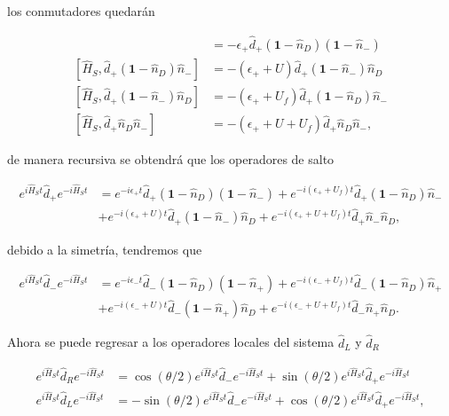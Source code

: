 \begin{appendixs}
los conmutadores quedarán

\begin{align*}
    [\hat{H}_{S},\hat{d}_{+}(\textbf{1}-\hat{n}_{D})(\textbf{1} - \hat{n}_{-})] & = - \epsilon_{+}\hat{d}_{+}(\textbf{1}-\hat{n}_{D})(\textbf{1} - \hat{n}_{-}) \\
    [\hat{H}_{S},\hat{d}_{+}(\textbf{1}-\hat{n}_{D})\hat{n}_{-}] & = - (\epsilon_{+} + U)\hat{d}_{+}(\textbf{1} - \hat{n}_{-})\hat{n}_{D} \\
    [\hat{H}_{S},\hat{d}_{+}(\textbf{1}-\hat{n}_{-})\hat{n}_{D}] & = - (\epsilon_{+} + U_{f})\hat{d}_{+}(\textbf{1} - \hat{n}_{D})\hat{n}_{-} \\
    [\hat{H}_{S},\hat{d}_{+}\hat{n}_{D}\hat{n}_{-}] & = - (\epsilon_{+} + U + U_{f})\hat{d}_{+}\hat{n}_{D}\hat{n}_{-}, 
\end{align*}

de manera recursiva se obtendrá que los operadores de salto

\begin{align*}
    e^{i \hat{H}_{S}t}\hat{d}_{+}e^{-i\hat{H}_{S}t} & = e^{-i\epsilon_{+}t}\hat{d}_{+}(\textbf{1}-\hat{n}_{D})(\textbf{1}-\hat{n}_{-}) + e^{-i(\epsilon_{+}+U_{f})t} \hat{d}_{+}(\textbf{1}-\hat{n}_{D})\hat{n}_{-} \\
    & + e^{-i(\epsilon_{+}+U)t}\hat{d}_{+}(\textbf{1}-\hat{n}_{-})\hat{n}_{D} + e^{-i(\epsilon_{+}+U+U_{f})t}\hat{d}_{+}\hat{n}_{-}\hat{n}_{D},
\end{align*}

debido a la simetría, tendremos que

\begin{align*}
    e^{i \hat{H}_{S}t}\hat{d}_{-}e^{-i\hat{H}_{S}t} & = e^{-i\epsilon_{-}t}\hat{d}_{-}(\textbf{1}-\hat{n}_{D})(\textbf{1}-\hat{n}_{+}) + e^{-i(\epsilon_{-}+U_{f})t} \hat{d}_{-}(\textbf{1}-\hat{n}_{D})\hat{n}_{+} \\
    & + e^{-i(\epsilon_{-}+U)t}\hat{d}_{-}(\textbf{1}-\hat{n}_{+})\hat{n}_{D} + e^{-i(\epsilon_{-}+U+U_{f})t}\hat{d}_{-}\hat{n}_{+}\hat{n}_{D}.
\end{align*}

Ahora se puede regresar a los operadores locales del sistema $\hat{d}_{L}$ y $\hat{d}_{R}$

\begin{align*}
    e^{i\hat{H}_{S}t}\hat{d}_{R}e^{-i\hat{H}_{S}t} & = \cos(\theta/2)e^{i\hat{H}_{S}t}\hat{d}_{-}e^{-i\hat{H}_{S}t} + \sin(\theta/2)e^{i\hat{H}_{S}t}\hat{d}_{+}e^{-i\hat{H}_{S}t}  \\
    e^{i\hat{H}_{S}t}\hat{d}_{L}e^{-i\hat{H}_{S}t} & = -\sin(\theta/2)e^{i\hat{H}_{S}t}\hat{d}_{-}e^{-i\hat{H}_{S}t} + \cos(\theta/2)e^{i\hat{H}_{S}t}\hat{d}_{+}e^{-i\hat{H}_{S}t},
\end{align*}


\end{appendixs}
